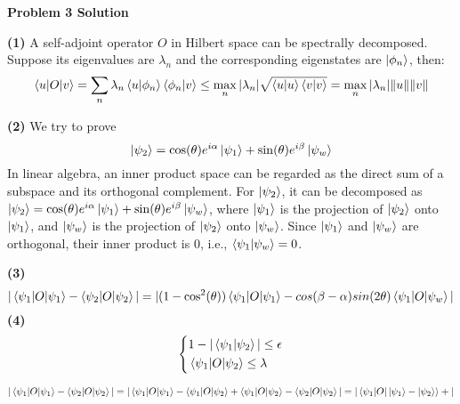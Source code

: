 \documentclass[12pt]{article}
\begin{document}
\begin{center}
    \textbf{Problem 3 Solution}
\end{center}

\textbf{(1)} 
A self-adjoint operator $O$ in Hilbert space can be spectrally decomposed. Suppose its eigenvalues are $\lambda_n$ and the corresponding eigenstates are $\ket{\phi_n}$, then:
\[
\braket{u|O|v} = \sum_n \lambda_n \braket{u|\phi_n}\braket{\phi_n|v} \le \max_n |\lambda_n| \sqrt{\braket{u|u} \braket{v|v}} = \max_n |\lambda_n| \|u\| \|v\| 
 \]

\textbf{(2)}
We try to prove
\[
\ket{\psi_2} = \cos(\theta) e^{i\alpha} \ket{\psi_1} + \sin(\theta) e^{i\beta} \ket{\psi_w}
\]
 In linear algebra, an inner product space can be regarded as the direct sum of a subspace and its orthogonal complement. For $\ket{\psi_2}$, it can be decomposed as $\ket{\psi_2} = \cos(\theta) e^{i\alpha} \ket{\psi_1} + \sin(\theta) e^{i\beta} \ket{\psi_w}$, where $\ket{\psi_1}$ is the projection of $\ket{\psi_2}$ onto $\ket{\psi_1}$, and $\ket{\psi_w}$ is the projection of $\ket{\psi_2}$ onto $\ket{\psi_w}$. Since $\ket{\psi_1}$ and $\ket{\psi_w}$ are orthogonal, their inner product is 0, i.e., $\braket{\psi_1 | \psi_w} = 0$.

\textbf{(3)}
\[
|\braket{\psi_1|O|\psi_1}-\braket{\psi_2|O|\psi_2}|=|(1-\cos^2(\theta))\braket{\psi_1|O|\psi_1} - cos(\beta-\alpha)sin(2 \theta)\braket{\psi_1|O|\psi_w}|
\]
\textbf{(4)}
\[
\left\{
\begin{aligned}
    &1-|\braket{\psi_1|\psi_2}|\le \epsilon \\
    &\braket{\psi_1|O|\psi_2} \le \lambda\\
\end{aligned}
\right.
\]

$|\braket{\psi_1|O|\psi_1}-\braket{\psi_2|O|\psi_2}|=|\braket{\psi_1|O|\psi_1}-\braket{\psi_1|O|\psi_2}+\braket{\psi_1|O|\psi_2}-\braket{\psi_2|O|\psi_2}|= \\
|\braket{\psi_1|O|\ket{\psi_1}-\ket{\psi_2}}+|$
\end{document}
